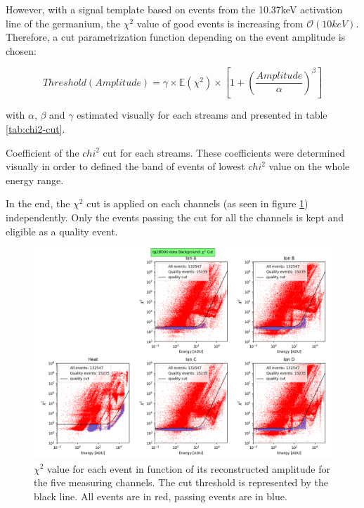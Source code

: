 However, with a signal template based on events from the 10.37keV activation line of the germanium, the $\chi^2$ value of good events is increasing from $\mathcal{O}(10keV)$.
Therefore, a cut parametrization function depending on the event amplitude is chosen:

\begin{equation}
Threshold(Amplitude) 
= \gamma \times \mathbb{E}\left( \chi^2 \right)  \times \left[ 1+ \left( \frac{Amplitude}{\alpha} \right)^\beta \right]
\end{equation}

with $\alpha$, $\beta$ and $\gamma$ estimated visually for each streams and presented in table \ref{tab:chi2-cut}.

\begin{table}[]
\centering

\caption{Coefficient of the $chi^2$ cut for each streams. These coefficients were determined visually in order to defined the band of events of lowest $chi^2$ value on the whole energy range.}
\label{tab:chi2-cut}
\end{table}


In the end, the $\chi^2$ cut is applied on each channels (as seen in figure \ref{fig:chi2-cut}) independently. Only the events passing the cut for all the channels is kept and eligible as a quality event.

\begin{figure}
\centering
\includegraphics[width=\linewidth,]{Figures/Neutron/chi2_cut.png}
\caption{$\chi^2$ value for each event in function of its reconstructed amplitude for the five measuring channels. The cut threshold is represented by the black line. All events are in red, passing events are in blue.}
\label{fig:chi2-cut}
\end{figure}

